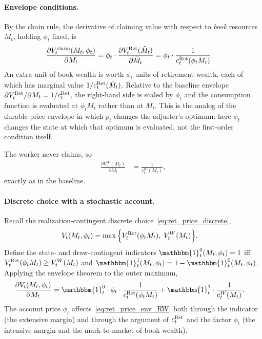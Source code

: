 \paragraph{Envelope conditions.}
By the chain rule, the derivative of claiming value with respect to \emph{book} resources $M_t$, holding $\phi_t$ fixed, is
\begin{align}
	\frac{\partial V_t^{\mathrm{claim}}(M_t,\phi_t)}{\partial M_t}
	&= \phi_t\cdot\frac{\partial V_t^{\mathrm{Ret}}(\tilde M_t)}{\partial\tilde M_t}
	= \phi_t\cdot\frac{1}{c_t^{\mathrm{Ret}}(\phi_t M_t)}.
	\label{eq:ret_price_env_Ret}
\end{align}
An extra unit of book wealth is worth $\phi_t$ units of retirement wealth, each of which has marginal value $1/c_t^{\mathrm{Ret}}(\tilde M_t)$. Relative to the baseline envelope $\partial V_t^{\mathrm{Ret}}/\partial M_t=1/c_t^{\mathrm{Ret}}$, the right-hand side is scaled by $\phi_t$ and the consumption function is evaluated at $\phi_t M_t$ rather than at $M_t$. This is the analog of the durable-price envelope in which $p_t$ changes the adjuster's optimum: here $\phi_t$ changes the state at which that optimum is evaluated, not the first-order condition itself.

The worker never claims, so
\begin{align}
	\frac{\partial V_t^{W}(M_t)}{\partial M_t}
	&= \frac{1}{c_t^{W}(M_t)},
	\label{eq:ret_price_env_W}
\end{align}
exactly as in the baseline.

\paragraph{Discrete choice with a stochastic account.}
Recall the realization-contingent discrete choice~\eqref{eq:ret_price_discrete},
\begin{align}
	V_t(M_t,\phi_t)
	&= \max\Big\{V_t^{\mathrm{Ret}}(\phi_t M_t),\; V_t^{W}(M_t)\Big\}.
\end{align}
Define the state- and draw-contingent indicators $\mathbbm{1}_t^{0}(M_t,\phi_t)=1$ iff $V_t^{\mathrm{Ret}}(\phi_t M_t)\ge V_t^{W}(M_t)$ and $\mathbbm{1}_t^{1}(M_t,\phi_t)=1-\mathbbm{1}_t^{0}(M_t,\phi_t)$. Applying the envelope theorem to the outer maximum,
\begin{align}
	\frac{\partial V_t(M_t,\phi_t)}{\partial M_t}
	&= \mathbbm{1}_t^{0}\cdot\phi_t\cdot\frac{1}{c_t^{\Ret}(\phi_t M_t)}
	+\mathbbm{1}_t^{1}\cdot\frac{1}{c_t^{W}(M_t)}.
	\label{eq:ret_price_env_RW}
\end{align}
The account price $\phi_t$ affects~\eqref{eq:ret_price_env_RW} both through the indicator (the extensive margin) and through the argument of $c_t^{\mathrm{Ret}}$ and the factor $\phi_t$ (the intensive margin and the mark-to-market of book wealth).

